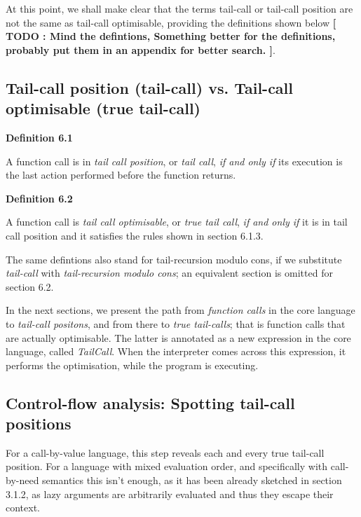 \documentclass[diploma]{softlab-thesis}
\begin{document}
At this point, we shall make clear that the terms tail-call or tail-call position are not the same 
as tail-call optimisable, providing the definitions shown below \textbf{[ TODO : Mind the defintions, Something better 
for the definitions, probably put them in an appendix for better search. ]}.

\subsection{Tail-call position (tail-call) vs. Tail-call optimisable (true tail-call)}

\textbf{Definition 6.1} 
\newline 
\par A function call is in \textit{tail call position}, or \textit{tail call}, \textit{if and only if} its execution is the last action 
performed before the function returns.
\newline
\par \textbf{Definition 6.2}
\newline
\par A function call is \textit{tail call optimisable}, or \textit{true tail call}, \textit{if and only if} it is in tail call position and it satisfies the rules shown in 
section 6.1.3.
\newline 
\par The same defintions also stand for tail-recursion modulo cons, if we substitute \textit{tail-call} with 
\textit{tail-recursion modulo cons}; an equivalent section is omitted for section 6.2.
\newline
\par In the next sections, we present the path from \textit{function calls} in the core language to \textit{tail-call positons}, 
and from there to \textit{true tail-calls}; that is function calls that are actually optimisable. The latter is annotated as a new 
expression in the core language, called \textit{TailCall}. When the interpreter comes across this expression, it performs the 
optimisation, while the program is executing.

\subsection{Control-flow analysis: Spotting tail-call positions}

For a call-by-value language, this step reveals each and every true tail-call position. For a language with mixed evaluation order, and specifically 
with call-by-need semantics this isn't enough, as it has been already sketched in section 3.1.2, as lazy arguments are arbitrarily evaluated and thus 
they escape their context. 
\end{document}
